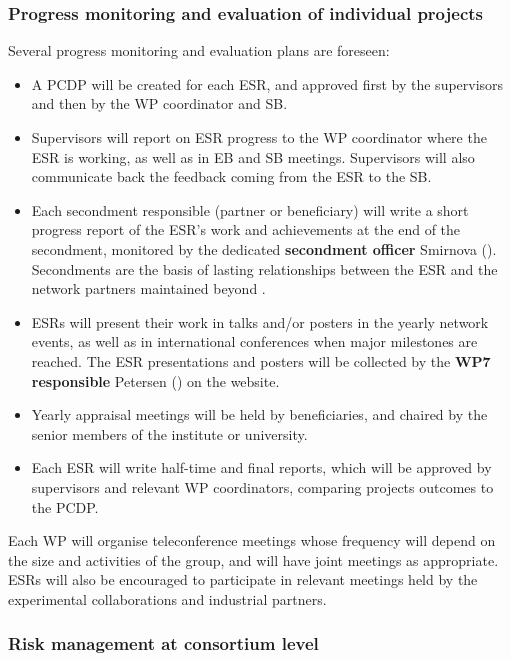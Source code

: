\vspace{-2mm}

\subsubsection{Progress monitoring and evaluation of individual projects}
\label{sub:progressMonitoring}
 
Several progress monitoring and evaluation plans are foreseen:
\begin{itemize}%
\item A PCDP will be created for each ESR, and approved first by the supervisors and then by the WP coordinator and SB.
\item Supervisors will report on ESR progress to the WP coordinator where the ESR is working, as well as in EB and SB meetings. 
Supervisors will also communicate back the feedback coming from the ESR to the SB.  
\item Each secondment responsible (partner or beneficiary) will write a short progress report of the ESR's work and achievements at the end of the secondment, monitored by the dedicated \textbf{secondment officer} Smirnova (\lundentity). 
Secondments are the basis of lasting relationships between the ESR and the network partners maintained beyond \acronym. 
\item ESRs will present their work in talks and/or posters in the yearly network events, as well as in international conferences when major milestones are reached. 
The ESR presentations and posters will be collected by the \textbf{WP7 responsible} Petersen (\cernentity) on the \acronym website. 
\item Yearly appraisal meetings will be held by beneficiaries, and chaired by the senior members of the institute or university.
\item Each ESR will write half-time and final reports, which will be approved by supervisors and relevant WP coordinators, comparing projects outcomes to the PCDP. 
\end{itemize}
Each WP will organise teleconference meetings whose frequency will depend on the size and activities of the group, and will have joint meetings as appropriate.
ESRs will also be encouraged to participate in relevant meetings held by the experimental collaborations and industrial partners.
 
\vspace{-2mm}
\subsubsection{Risk management at consortium level}

